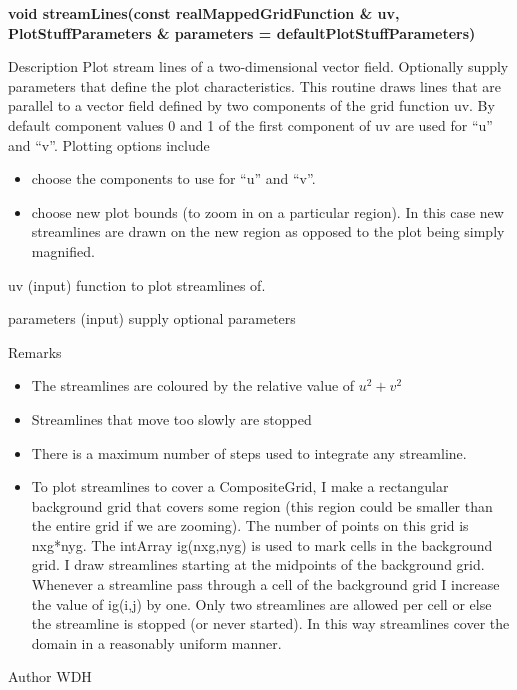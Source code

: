 \begin{flushleft} \textbf{%
\settowidth{\argIndent}{void streamLines(}%
void streamLines(const realMappedGridFunction \& uv, \\ 
\hspace{\argIndent}             PlotStuffParameters \& parameters  = defaultPlotStuffParameters)
}\end{flushleft}
\begin{Lentry}

\item[Description] 
  Plot stream lines of a two-dimensional vector field.
  Optionally supply parameters that define the plot characteristics.
  This routine draws lines that are parallel to a vector field defined by
  two components of the grid function {\ff uv}. By default component values
  0 and 1 of the first component of {\ff uv} are used for ``u'' and ``v''.
  Plotting options include
  \begin{itemize}
    \item choose the components to use for ``u'' and ``v''.
    \item choose new plot bounds (to zoom in on a particular region). In this case
          new streamlines are drawn on the new region as opposed to the plot
          being simply magnified.
  \end{itemize}

\item[uv (input)]  function to plot streamlines of.
\item[parameters (input)]  supply optional parameters

\item[Remarks] 
  \begin{itemize}
    \item The streamlines are coloured by the relative value of $u^2+v^2$
    \item Streamlines that move too slowly are stopped  
    \item There is a maximum number of steps used to integrate any streamline.
    \item To plot streamlines to cover a CompositeGrid, I make a rectangular
          background grid that covers some region (this region could be
          smaller than the entire grid if we are zooming). The number of
          points on this grid is nxg*nyg. The intArray ig(nxg,nyg) is used
          to mark cells in the background grid. I draw streamlines starting
          at the midpoints of the background grid. Whenever a streamline
          pass through a cell of the background grid I increase the value
          of ig(i,j) by one. Only two streamlines are allowed per cell
          or else the streamline is stopped (or never started).
            In this way streamlines cover the domain in a reasonably
          uniform manner.
  \end{itemize}

\item[Author]  WDH

\end{Lentry}
